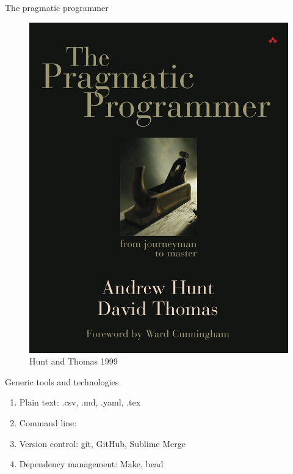 \documentclass[
  ignorenonframetext,
  aspectratio=54,
]{beamer}
\providecommand{\tightlist}{%
  \setlength{\itemsep}{0pt}\setlength{\parskip}{0pt}}
\begin{document}
\begin{frame}{The pragmatic programmer}
\protect\hypertarget{the-pragmatic-programmer}{}
\begin{figure}
\centering
\includegraphics{assets/img/pragmatic.jpg}
\caption{Hunt and Thomas 1999}
\end{figure}
\end{frame}

\begin{frame}{Generic tools and technologies}
\protect\hypertarget{generic-tools-and-technologies}{}
\begin{enumerate}
\tightlist
\item
  Plain text: .csv, .md, .yaml, .tex
\item
  Command line:
\item
  Version control: git, GitHub, Sublime Merge
\item
  Dependency management: Make, bead
\end{enumerate}
\end{frame}
\end{document}
